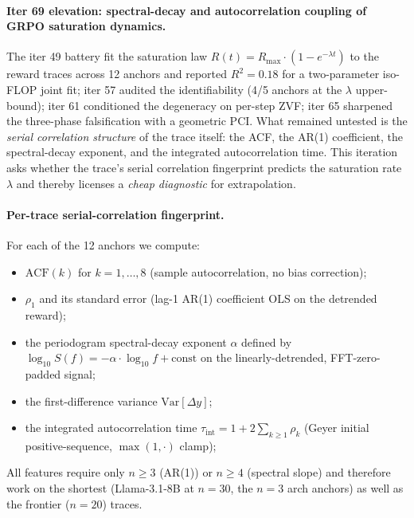 \paragraph{Iter 69 elevation: spectral-decay and autocorrelation coupling of GRPO saturation dynamics.}
\label{par:scaling-iter69}
The iter 49 battery fit the saturation law
$R(t) = R_\mathrm{max} \cdot \left(1 - e^{-\lambda t}\right)$ to the
reward traces across 12 anchors and reported
$R^2 = 0.18$ for a two-parameter iso-FLOP joint fit; iter 57
audited the identifiability (4/5 anchors at the $\lambda$
upper-bound); iter 61 conditioned the degeneracy on per-step
ZVF; iter 65 sharpened the three-phase falsification with a
geometric PCI.  What remained untested is the \emph{serial
correlation structure} of the trace itself: the ACF, the AR(1)
coefficient, the spectral-decay exponent, and the integrated
autocorrelation time.  This iteration asks whether the trace's
serial correlation fingerprint predicts the saturation rate
$\lambda$ and thereby licenses a \emph{cheap diagnostic} for
extrapolation.

\paragraph{Per-trace serial-correlation fingerprint.}
For each of the 12 anchors we compute:
\begin{itemize}
  \item $\mathrm{ACF}(k)$ for $k = 1, \dots, 8$ (sample autocorrelation, no bias correction);
  \item $\rho_1$ and its standard error (lag-1 AR(1) coefficient OLS on the detrended reward);
  \item the periodogram spectral-decay exponent $\alpha$ defined by
        $\log_{10} S(f) = -\alpha \cdot \log_{10} f + \mathrm{const}$
        on the linearly-detrended, FFT-zero-padded signal;
  \item the first-difference variance $\mathrm{Var}[\Delta y]$;
  \item the integrated autocorrelation time
        $\tau_\mathrm{int} = 1 + 2 \sum_{k \geq 1} \rho_k$
        (Geyer initial positive-sequence, $\max(1, \cdot)$ clamp);
\end{itemize}
All features require only $n \geq 3$ (AR(1)) or $n \geq 4$
(spectral slope) and therefore work on the shortest
(Llama-3.1-8B at $n = 30$, the $n = 3$ arch anchors) as well as the
frontier ($n = 20$) traces.


